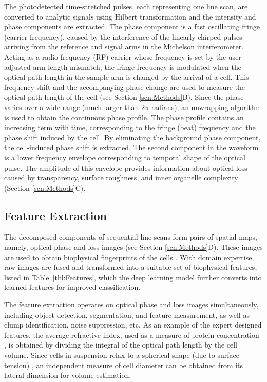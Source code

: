 \documentclass[aps,pra,reprint,longbibliography,superscriptaddress]{revtex4-1}
\begin{document}
The photodetected time-stretched pulses, each representing one line scan, are converted to analytic signals using Hilbert transformation \cite{king2009hilbert} and the intensity and phase components are extracted. The phase component is a fast oscillating fringe (carrier frequency), caused by the interference of the linearly chirped pulses arriving from the reference and signal arms in the Michelson interferometer. Acting as a radio-frequency (RF) carrier whose frequency is set by the user adjusted arm length mismatch, the fringe frequency is modulated when the optical path length in the sample arm is changed by the arrival of a cell. This frequency shift and the accompanying phase change are used to measure the optical path length of the cell (see Section \ref{scn:Methods}B). Since the phase varies over a wide range (much larger than $2 \pi$ radians), an unwrapping algorithm is used to obtain the continuous phase profile. The phase profile contains an increasing term with time, corresponding to the fringe (beat) frequency and the phase shift induced by the cell. By eliminating the background phase component, the cell-induced phase shift is extracted. The second component in the waveform is a lower frequency envelope corresponding to temporal shape of the optical pulse. The amplitude of this envelope provides information about optical loss caused by transparency, surface roughness, and inner organelle complexity (Section \ref{scn:Methods}C). 

\subsection{Feature Extraction}

The decomposed components of sequential line scans form pairs of spatial maps, namely, optical phase and loss images (see Section \ref{scn:Methods}D). These images are used to obtain biophysical fingerprints of the cells \cite{mahjoubfar2013optically, driscoll2012automated}. With domain expertise, raw images are fused and transformed into a suitable set of biophysical features, listed in Table~\ref{tbl:Features}, which the deep learning model further converts into learned features for improved classification. 

The feature extraction operates on optical phase and loss images simultaneously, including object detection, segmentation, and feature measurement, as well as clump identification, noise suppression, etc. As an example of the expert designed features, the average refractive index, used as a measure of protein concentration \cite{barer1953refractometry}, is obtained by dividing the integral of the optical path length by the cell volume. Since cells in suspension relax to a spherical shape (due to surface tension) \cite{revel1974adhesion,whur1977substrate}, an independent measure of cell diameter can be obtained from its lateral dimension for volume estimation. 
\end{document}
